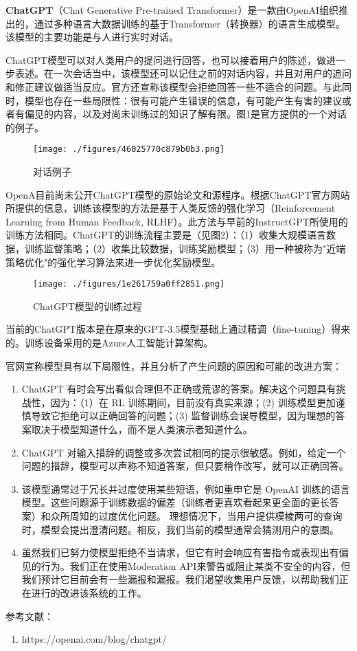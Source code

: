 
\textbf{ChatGPT}（Chat Generative Pre-trained Transformer）是一款由OpenAI组织推出的，通过多种语言大数据训练的基于Transformer（转换器）的语言生成模型。该模型的主要功能是与人进行实时对话。

ChatGPT模型可以对人类用户的提问进行回答，也可以接着用户的陈述，做进一步表述。在一次会话当中，该模型还可以记住之前的对话内容，并且对用户的追问和修正建议做适当反应。官方还宣称该模型会拒绝回答一些不适合的问题。与此同时，模型也存在一些局限性：很有可能产生错误的信息，有可能产生有害的建议或者有偏见的内容，以及对尚未训练过的知识了解有限。图1是官方提供的一个对话的例子。

\begin{figure}[ht]
\centering
\texttt{[image: ./figures/46025770c879b0b3.png]}
\caption{对话例子} \label{fig_ChGPT_2}
\end{figure}

OpenA目前尚未公开ChatGPT模型的原始论文和源程序。根据ChatGPT官方网站所提供的信息，训练该模型的方法是基于人类反馈的强化学习（Reinforcement Learning from Human Feedback, RLHF）。此方法与早前的InstructGPT所使用的训练方法相同。ChatGPT的训练流程主要是（见图2）：（1）收集大规模语言数据，训练监督策略；（2）收集比较数据，训练奖励模型；（3）用一种被称为"近端策略优化"的强化学习算法来进一步优化奖励模型。
\begin{figure}[ht]
\centering
\texttt{[image: ./figures/1e261759a0ff2851.png]}
\caption{ChatGPT模型的训练过程} \label{fig_ChGPT_1}
\end{figure}
当前的ChatGPT版本是在原来的GPT-3.5模型基础上通过精调（fine-tuning）得来的。训练设备采用的是Azure人工智能计算架构。

官网宣称模型具有以下局限性，并且分析了产生问题的原因和可能的改进方案：
\begin{enumerate}
\item ChatGPT 有时会写出看似合理但不正确或荒谬的答案。解决这个问题具有挑战性，因为：（1）在 RL 训练期间，目前没有真实来源；(2) 训练模型更加谨慎导致它拒绝可以正确回答的问题；(3) 监督训练会误导模型，因为理想的答案取决于模型知道什么，而不是人类演示者知道什么。
\item ChatGPT 对输入措辞的调整或多次尝试相同的提示很敏感。例如，给定一个问题的措辞，模型可以声称不知道答案，但只要稍作改写，就可以正确回答。
\item 该模型通常过于冗长并过度使用某些短语，例如重申它是 OpenAI 训练的语言模型。这些问题源于训练数据的偏差（训练者更喜欢看起来更全面的更长答案）和众所周知的过度优化问题。
理想情况下，当用户提供模棱两可的查询时，模型会提出澄清问题。相反，我们当前的模型通常会猜测用户的意图。
\item 虽然我们已努力使模型拒绝不当请求，但它有时会响应有害指令或表现出有偏见的行为。我们正在使用Moderation API来警告或阻止某类不安全的内容，但我们预计它目前会有一些漏报和漏报。我们渴望收集用户反馈，以帮助我们正在进行的改进该系统的工作。
\end{enumerate}



参考文献：
\begin{enumerate}
\item https://openai.com/blog/chatgpt/
\end{enumerate}